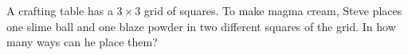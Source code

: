 A crafting table has a $3\times3$ grid of squares. To make magma cream, Steve places one slime ball and one blaze powder in two different squares of the grid. In how many ways can he place them?
